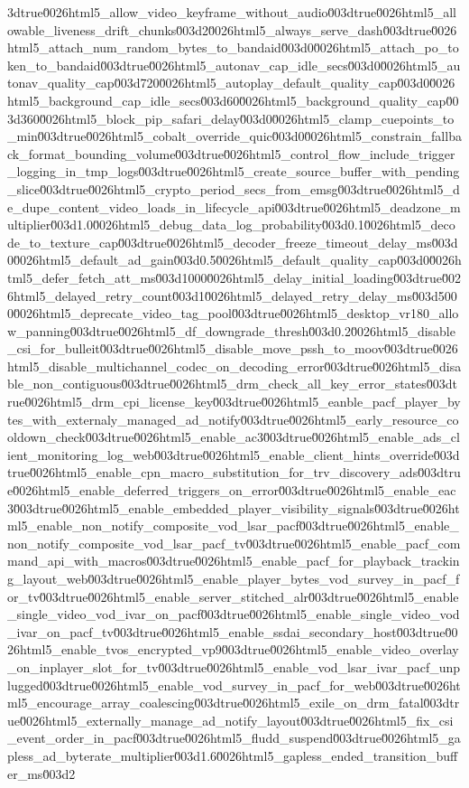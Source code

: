 {3dtrue\u0026html5_allow_video_keyframe_without_audio\u003dtrue\u0026html5_allowable_liveness_drift_chunks\u003d2\u0026html5_always_serve_dash\u003dtrue\u0026html5_attach_num_random_bytes_to_bandaid\u003d0\u0026html5_attach_po_token_to_bandaid\u003dtrue\u0026html5_autonav_cap_idle_secs\u003d0\u0026html5_autonav_quality_cap\u003d720\u0026html5_autoplay_default_quality_cap\u003d0\u0026html5_background_cap_idle_secs\u003d60\u0026html5_background_quality_cap\u003d360\u0026html5_block_pip_safari_delay\u003d0\u0026html5_clamp_cuepoints_to_min\u003dtrue\u0026html5_cobalt_override_quic\u003d0\u0026html5_constrain_fallback_format_bounding_volume\u003dtrue\u0026html5_control_flow_include_trigger_logging_in_tmp_logs\u003dtrue\u0026html5_create_source_buffer_with_pending_slice\u003dtrue\u0026html5_crypto_period_secs_from_emsg\u003dtrue\u0026html5_de_dupe_content_video_loads_in_lifecycle_api\u003dtrue\u0026html5_deadzone_multiplier\u003d1.0\u0026html5_debug_data_log_probability\u003d0.1\u0026html5_decode_to_texture_cap\u003dtrue\u0026html5_decoder_freeze_timeout_delay_ms\u003d0\u0026html5_default_ad_gain\u003d0.5\u0026html5_default_quality_cap\u003d0\u0026html5_defer_fetch_att_ms\u003d1000\u0026html5_delay_initial_loading\u003dtrue\u0026html5_delayed_retry_count\u003d1\u0026html5_delayed_retry_delay_ms\u003d5000\u0026html5_deprecate_video_tag_pool\u003dtrue\u0026html5_desktop_vr180_allow_panning\u003dtrue\u0026html5_df_downgrade_thresh\u003d0.2\u0026html5_disable_csi_for_bulleit\u003dtrue\u0026html5_disable_move_pssh_to_moov\u003dtrue\u0026html5_disable_multichannel_codec_on_decoding_error\u003dtrue\u0026html5_disable_non_contiguous\u003dtrue\u0026html5_drm_check_all_key_error_states\u003dtrue\u0026html5_drm_cpi_license_key\u003dtrue\u0026html5_eanble_pacf_player_bytes_with_externaly_managed_ad_notify\u003dtrue\u0026html5_early_resource_cooldown_check\u003dtrue\u0026html5_enable_ac3\u003dtrue\u0026html5_enable_ads_client_monitoring_log_web\u003dtrue\u0026html5_enable_client_hints_override\u003dtrue\u0026html5_enable_cpn_macro_substitution_for_trv_discovery_ads\u003dtrue\u0026html5_enable_deferred_triggers_on_error\u003dtrue\u0026html5_enable_eac3\u003dtrue\u0026html5_enable_embedded_player_visibility_signals\u003dtrue\u0026html5_enable_non_notify_composite_vod_lsar_pacf\u003dtrue\u0026html5_enable_non_notify_composite_vod_lsar_pacf_tv\u003dtrue\u0026html5_enable_pacf_command_api_with_macros\u003dtrue\u0026html5_enable_pacf_for_playback_tracking_layout_web\u003dtrue\u0026html5_enable_player_bytes_vod_survey_in_pacf_for_tv\u003dtrue\u0026html5_enable_server_stitched_alr\u003dtrue\u0026html5_enable_single_video_vod_ivar_on_pacf\u003dtrue\u0026html5_enable_single_video_vod_ivar_on_pacf_tv\u003dtrue\u0026html5_enable_ssdai_secondary_host\u003dtrue\u0026html5_enable_tvos_encrypted_vp9\u003dtrue\u0026html5_enable_video_overlay_on_inplayer_slot_for_tv\u003dtrue\u0026html5_enable_vod_lsar_ivar_pacf_unplugged\u003dtrue\u0026html5_enable_vod_survey_in_pacf_for_web\u003dtrue\u0026html5_encourage_array_coalescing\u003dtrue\u0026html5_exile_on_drm_fatal\u003dtrue\u0026html5_externally_manage_ad_notify_layout\u003dtrue\u0026html5_fix_csi_event_order_in_pacf\u003dtrue\u0026html5_fludd_suspend\u003dtrue\u0026html5_gapless_ad_byterate_multiplier\u003d1.6\u0026html5_gapless_ended_transition_buffer_ms\u003d2}
